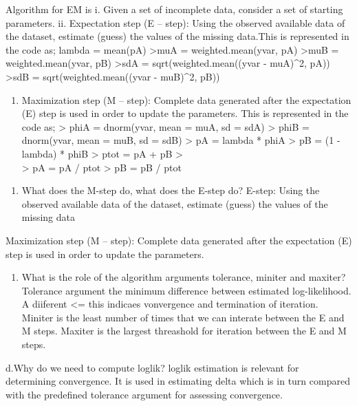 \documentclass[]{article}
\providecommand{\tightlist}{%
  \setlength{\itemsep}{0pt}\setlength{\parskip}{0pt}}
\begin{document}
Algorithm for EM is i. Given a set of incomplete data, consider a set of
starting parameters. ii. Expectation step (E -- step): Using the
observed available data of the dataset, estimate (guess) the values of
the missing data.This is represented in the code as; lambda = mean(pA)
\textgreater{}muA = weighted.mean(yvar, pA) \textgreater{}muB =
weighted.mean(yvar, pB) \textgreater{}sdA = sqrt(weighted.mean((yvar -
muA)\^{}2, pA)) \textgreater{}sdB = sqrt(weighted.mean((yvar -
muB)\^{}2, pB))

\begin{enumerate}
\def\labelenumi{\roman{enumi}.}
\setcounter{enumi}{2}
\tightlist
\item
  Maximization step (M -- step): Complete data generated after the
  expectation (E) step is used in order to update the parameters. This
  is represented in the code as; \textgreater{} phiA = dnorm(yvar, mean
  = muA, sd = sdA) \textgreater{} phiB = dnorm(yvar, mean = muB, sd =
  sdB) \textgreater{} pA = lambda * phiA \textgreater{} pB = (1 -
  lambda) * phiB \textgreater{} ptot = pA + pB \textgreater{}\\
  \textgreater{} pA = pA / ptot \textgreater{} pB = pB / ptot
\end{enumerate}

\begin{enumerate}
\def\labelenumi{\alph{enumi}.}
\setcounter{enumi}{1}
\tightlist
\item
  What does the M-step do, what does the E-step do? E-step: Using the
  observed available data of the dataset, estimate (guess) the values of
  the missing data
\end{enumerate}

Maximization step (M -- step): Complete data generated after the
expectation (E) step is used in order to update the parameters.

\begin{enumerate}
\def\labelenumi{\alph{enumi}.}
\setcounter{enumi}{2}
\tightlist
\item
  What is the role of the algorithm arguments tolerance, miniter and
  maxiter? Tolerance argument the minimum difference between estimated
  log-likelihood. A diiferent \textless{}= this indicaes vonvergence and
  termination of iteration. Miniter is the least number of times that we
  can interate between the E and M steps. Maxiter is the largest
  threashold for iteration between the E and M steps.
\end{enumerate}

d.Why do we need to compute loglik? loglik estimation is relevant for
determining convergence. It is used in estimating delta which is in turn
compared with the predefined tolerance argument for assessing
convergence.
\end{document}
